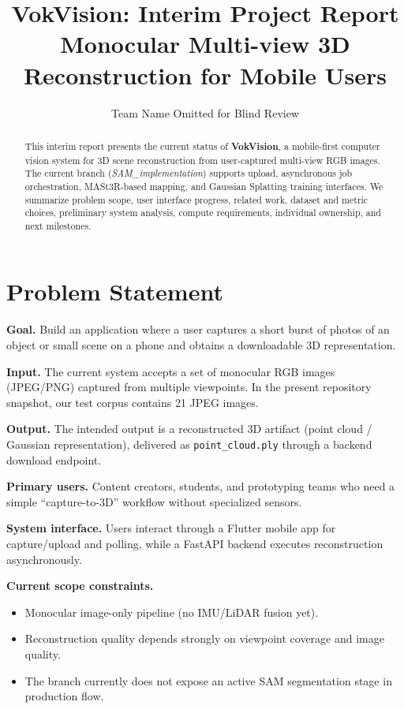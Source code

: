 \documentclass[10pt,twocolumn,letterpaper]{article}
\begin{document}
\title{VokVision: Interim Project Report\\
Monocular Multi-view 3D Reconstruction for Mobile Users}

\author{Team Name Omitted for Blind Review}
\maketitle

\begin{abstract}
This interim report presents the current status of \textbf{VokVision}, a mobile-first computer vision system for 3D scene reconstruction from user-captured multi-view RGB images. The current branch (\textit{SAM\_implementation}) supports upload, asynchronous job orchestration, MASt3R-based mapping, and Gaussian Splatting training interfaces. We summarize problem scope, user interface progress, related work, dataset and metric choices, preliminary system analysis, compute requirements, individual ownership, and next milestones.
\end{abstract}

\section{Problem Statement}
\textbf{Goal.} Build an application where a user captures a short burst of photos of an object or small scene on a phone and obtains a downloadable 3D representation.

\textbf{Input.} The current system accepts a set of monocular RGB images (JPEG/PNG) captured from multiple viewpoints. In the present repository snapshot, our test corpus contains 21 JPEG images.

\textbf{Output.} The intended output is a reconstructed 3D artifact (point cloud / Gaussian representation), delivered as \texttt{point\_cloud.ply} through a backend download endpoint.

\textbf{Primary users.} Content creators, students, and prototyping teams who need a simple ``capture-to-3D'' workflow without specialized sensors.

\textbf{System interface.} Users interact through a Flutter mobile app for capture/upload and polling, while a FastAPI backend executes reconstruction asynchronously.

\textbf{Current scope constraints.}
\begin{itemize}[leftmargin=*]
    \item Monocular image-only pipeline (no IMU/LiDAR fusion yet).
    \item Reconstruction quality depends strongly on viewpoint coverage and image quality.
    \item The branch currently does not expose an active SAM segmentation stage in production flow.
\end{itemize}
\end{document}
